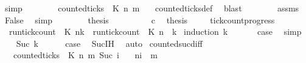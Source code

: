 \begin{isabellebody}
\ simp\isanewline
\ \ \ \ \ \ \isamarkupfalse%
\ {\isacartoucheopen}{\isasymnot}counted{\isacharunderscore}ticks\ {\isasymrho}\ K\ n\ m\ {}{\isacartoucheclose}\ \isamarkupfalse%
\ counted{\isacharunderscore}ticks{\isacharunderscore}def\ \isamarkupfalse%
\ blast\isanewline
\ \ \ \ \ \ \isamarkupfalse%
\ assms\ \isamarkupfalse%
\ False\ \isamarkupfalse%
\ simp\isanewline
\ \ \ \ \ \ \isamarkupfalse%
\ {\isacharquery}thesis\ \isacommand{{\isachardot}{\isachardot}}\isamarkupfalse%
\isanewline
\ \ \isamarkupfalse%
\isanewline
\ \ \ \ \isamarkupfalse%
\ c\ \isamarkupfalse%
\ {\isacharquery}thesis\ \isacommand{{\isachardot}}\isamarkupfalse%
\isanewline
\ \ \isamarkupfalse%
\isanewline
{}\isamarkupfalse%
%
\endisatagproof
{\isafoldproof}%
%
\isadelimproof
\isanewline
%
\endisadelimproof
\isanewline
{}\isamarkupfalse%
\ tick{\isacharunderscore}count{\isacharunderscore}progress{\isacharcolon}\isanewline
\ \ {\isacartoucheopen}run{\isacharunderscore}tick{\isacharunderscore}count\ {\isasymrho}\ K\ {\isacharparenleft}n{\isacharplus}k{\isacharparenright}\ {\isasymle}\ {\isacharparenleft}run{\isacharunderscore}tick{\isacharunderscore}count\ {\isasymrho}\ K\ n{\isacharparenright}\ {\isacharplus}\ k{\isacartoucheclose}\isanewline
%
\isadelimproof
%
\endisadelimproof
%
\isatagproof
{}\isamarkupfalse%
\ {\isacharparenleft}induction\ k{\isacharparenright}\isanewline
\ \ \isamarkupfalse%
\ {}\ \isamarkupfalse%
\ {\isacharquery}case\ \isamarkupfalse%
\ simp\isanewline
{}\isamarkupfalse%
\isanewline
\ \ \isamarkupfalse%
\ {\isacharparenleft}Suc\ k{\isacharprime}{\isacharparenright}\isanewline
\ \ \ \ \isamarkupfalse%
\ {\isacharquery}case\ \isamarkupfalse%
\ Suc{\isachardot}IH\ \isamarkupfalse%
\ auto\isanewline
{}\isamarkupfalse%
%
\endisatagproof
{\isafoldproof}%
%
\isadelimproof
\isanewline
%
\endisadelimproof
\isanewline
{}\isamarkupfalse%
\ counted{\isacharunderscore}suc{\isacharunderscore}diff{\isacharcolon}\isanewline
\ \ \ {\isacartoucheopen}counted{\isacharunderscore}ticks\ {\isasymrho}\ K\ n\ m\ {\isacharparenleft}Suc\ i{\isacharparenright}{\isacartoucheclose}\isanewline
\ \ \ {\isacartoucheopen}n{\isacharplus}i\ {\isacharless}\ m{\isacartoucheclose}\isanewline

\end{isabellebody}

